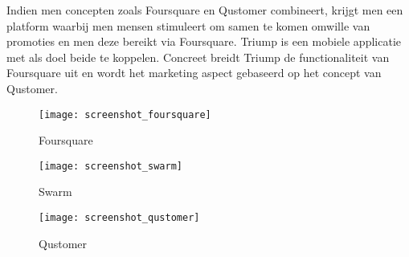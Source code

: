 Indien men concepten zoals Foursquare en Qustomer combineert, krijgt men een platform waarbij men mensen stimuleert om samen te komen omwille van promoties en men deze bereikt via Foursquare.
Triump is een mobiele applicatie met als doel beide te koppelen.
Concreet breidt Triump de functionaliteit van Foursquare uit en wordt het marketing aspect gebaseerd op het concept van Qustomer.
\begin{figure}[ht]
\begin{minipage}[b]{0.25\linewidth}
\centering
\texttt{[image: screenshot\_foursquare]}
\caption{Foursquare}
\label{fig:screenshot_foursquare}
\end{minipage}
\hspace{1.5cm}
\begin{minipage}[b]{0.25\linewidth}
\centering
\texttt{[image: screenshot\_swarm]}
\caption{Swarm}
\label{fig:screenshot_swarm}
\end{minipage}
\hspace{1.5cm}
\begin{minipage}[b]{0.25\linewidth}
\centering
\texttt{[image: screenshot\_qustomer]}
\caption{Qustomer}
\label{fig:screenshot_qustomer}
\end{minipage}
\end{figure}

